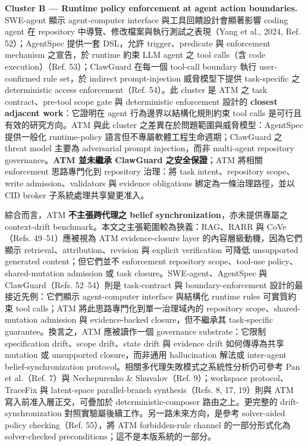 \documentclass[a4paper,fontset=none]{ctexart}
\begin{document}
\textbf{Cluster B --- Runtime policy enforcement at agent action boundaries.} SWE-agent 顯示 agent-computer interface 與工具回饋設計會顯著影響 coding agent 在 repository 中導覽、修改檔案與執行測試之表現（Yang et al., 2024, Ref. 52）；AgentSpec 提供一套 DSL，允許 trigger、predicate 與 enforcement mechanism 之宣告，於 runtime 約束 LLM agent 之 tool calls（含 code execution）（Ref. 53）；ClawGuard 在每一個 tool-call boundary 執行 user-confirmed rule set，於 indirect prompt-injection 威脅模型下提供 task-specific 之 deterministic access enforcement（Ref. 54）。此 cluster 是 ATM 之 task contract、pre-tool scope gate 與 deterministic enforcement 設計的 \textbf{closest adjacent work}：它證明在 agent 行為邊界以結構化規則約束 tool calls 是可行且有效的研究方向。ATM 與此 cluster 之差異在於問題範圍與威脅模型：AgentSpec 提供一般化 runtime-policy 語言但不專屬軟體工程生命週期；ClawGuard 之 threat model 主要為 adversarial prompt injection，而非 multi-agent repository governance。\textbf{ATM 並未繼承 ClawGuard 之安全保證}；ATM 將相關 enforcement 思路專門化到 repository 治理：將 task intent、repository scope、write admission、validators 與 evidence obligations 綁定為一條治理路徑，並以 CID broker 子系統處理共享變更准入。

綜合而言，ATM \textbf{不主張跨代理之 belief synchronization}，亦未提供專屬之 context-drift benchmark。本文之主張範圍較為狹義：RAG、RARR 與 CoVe（Refs. 49--51）應被視為 ATM evidence-closure layer 的內容層級動機，因為它們顯示 retrieval、attribution、revision 與 explicit verification 可降低 unsupported generated content；但它們並不 enforcement repository scope、tool-use policy、shared-mutation admission 或 task closure。SWE-agent、AgentSpec 與 ClawGuard（Refs. 52--54）則是 task-contract 與 boundary-enforcement 設計的最接近先例：它們顯示 agent-computer interface 與結構化 runtime rules 可實質約束 tool calls；ATM 將此思路專門化到單一治理域內的 repository scope、shared-mutation admission 與 evidence-backed closure，但不繼承其 task-specific guarantee。換言之，ATM 應被讀作一個 governance substrate：它限制 specification drift、scope drift、state drift 與 evidence drift 如何傳導為共享 mutation 或 unsupported closure，而非通用 hallucination 解法或 inter-agent belief-synchronization protocol。相關多代理失敗模式之系統性分析仍可參考 Pan et al.（Ref. 7）與 Nechepurenko \& Shuvalov（Ref. 9）；workspace protocol、TraceFix 與 latent-space parallel-branch synthesis（Refs. 8, 17, 19）則與 ATM 寫入前准入層正交，可疊加於 deterministic-composer 路由之上。更完整的 drift-synchronization 對照實驗屬後續工作。另一路未來方向，是參考 solver-aided policy checking（Ref. 55），將 ATM forbidden-rule channel 的一部分形式化為 solver-checked preconditions；這不是本版系統的一部分。
\end{document}
